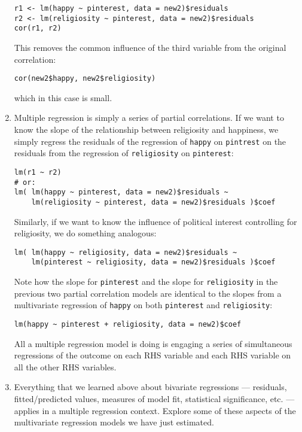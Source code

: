 \documentclass[a4paper,12pt]{article}
\begin{document}
\begin{enumerate}
\begin{verbatim}
r1 <- lm(happy ~ pinterest, data = new2)$residuals
r2 <- lm(religiosity ~ pinterest, data = new2)$residuals
cor(r1, r2)
\end{verbatim}

\noindent This removes the common influence of the third variable from the original correlation:

\begin{verbatim}
cor(new2$happy, new2$religiosity)
\end{verbatim}

\noindent which in this case is small.

\item Multiple regression is simply a series of partial correlations. If we want to know the slope of the relationship between religiosity and happiness, we simply regress the residuals of the regression of \texttt{happy} on \texttt{pintrest} on the residuals from the regression of \texttt{religiosity} on \texttt{pinterest}:

\begin{verbatim}
lm(r1 ~ r2)
# or:
lm( lm(happy ~ pinterest, data = new2)$residuals ~
    lm(religiosity ~ pinterest, data = new2)$residuals )$coef
\end{verbatim}

\noindent Similarly, if we want to know the influence of political interest controlling for religiosity, we do something analogous:

\begin{verbatim}
lm( lm(happy ~ religiosity, data = new2)$residuals ~
    lm(pinterest ~ religiosity, data = new2)$residuals )$coef
\end{verbatim}

\noindent Note how the slope for \texttt{pinterest} and the slope for \texttt{religiosity} in the previous two partial correlation models are identical to the slopes from a multivariate regression of \texttt{happy} on both \texttt{pinterest} and \texttt{religiosity}:

\begin{verbatim}
lm(happy ~ pinterest + religiosity, data = new2)$coef
\end{verbatim}

\noindent All a multiple regression model is doing is engaging a series of simultaneous regressions of the outcome on each RHS variable and each RHS variable on all the other RHS variables.

\item Everything that we learned above about bivariate regressions --- residuals, fitted/predicted values, measures of model fit, statistical significance, etc. --- applies in a multiple regression context. Explore some of these aspects of the multivariate regression models we have just estimated.


\end{enumerate}
\end{document}
